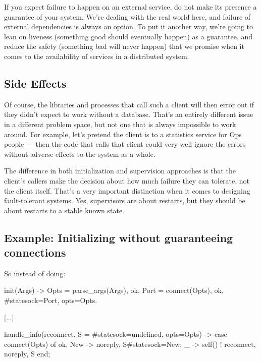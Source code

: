 \documentclass[11pt, oneside]{book}   	%
\begin{document}
If you expect failure to happen on an external service, do not make its presence a guarantee of your system. We're dealing with the real world here, and failure of external dependencies is always an option. To put it another way, we're going to lean on liveness (something good should eventually happen) as a guarantee, and reduce the safety (something bad will never happen) that we promise when it comes to the availability of services in a distributed system.

\subsection{Side Effects}
\label{subsec:start-link-side-effects}

Of course, the libraries and processes that call such a client will then error out if they didn't expect to work without a database. That's an entirely different issue in a different problem space, but not one that is always impossible to work around. For example, let's pretend the client is to a statistics service for Ops people — then the code that calls that client could very well ignore the errors without adverse effects to the system as a whole. 

The difference in both initialization and supervision approaches is that the client's callers make the decision about how much failure they can tolerate, not the client itself. That's a very important distinction when it comes to designing fault-tolerant systems. Yes, supervisors are about restarts, but they should be about restarts to a stable known state.

\subsection{Example: Initializing without guaranteeing connections}
\label{subsec:start-link-initializing-without-guaranteeing-connections}

So instead of doing:

\begin{VerbatimText}
init(Args) ->
    Opts = parse_args(Args),
    {ok, Port} = connect(Opts),
    {ok, #state{sock=Port, opts=Opts}}.

[...]

handle_info(reconnect, S = #state{sock=undefined, opts=Opts}) ->
    case connect(Opts) of
        {ok, New} -> {noreply, S#state{sock=New}};
         _ -> self() ! reconnect, {noreply, S}
    end;
\end{VerbatimText}
\end{document}
